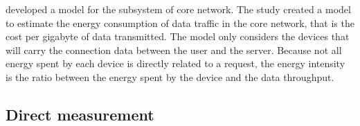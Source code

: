 \citet{Schien2015} developed a model for the subsystem of core network. The study created a model to estimate the energy consumption of data traffic in the core network, that is the cost per \ac{gigabyte} of data transmitted. 
The model only considers the devices that will carry the connection data between the user and the server. Because not all energy spent by each device is directly related to a request, the energy intensity is the ratio between the energy spent by the device and the data throughput.   



\subsection{Direct measurement}









